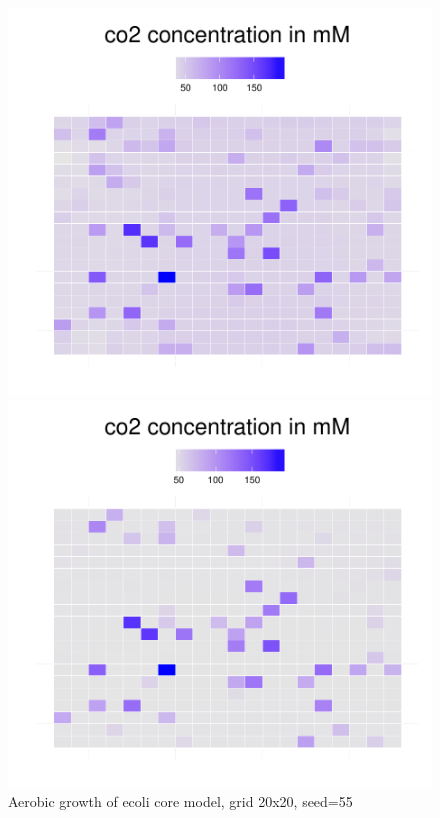 \begin{figure}[h]
{\begin{minipage}[t]{0.3\textwidth}
  \end{minipage}
  \begin{minipage}[t]{0.3\textwidth}
    \includegraphics[width=\textwidth]{../results/ecoli_20x20_aerob_seed55_co235.pdf}
  \end{minipage}
  \begin{minipage}[t]{0.3\textwidth}
    \includegraphics[width=\textwidth]{../results/ecoli_20x20_aerob_seed55_co250.pdf}
  \end{minipage}
  }
  \caption{Aerobic growth of ecoli core model, grid 20x20, seed=55}

\end{figure}
